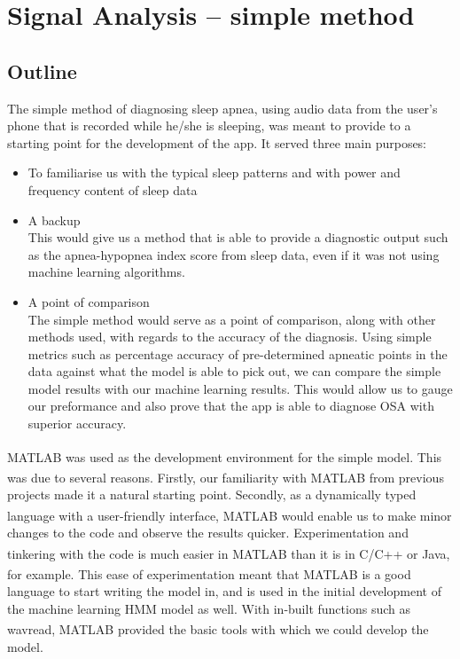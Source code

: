 \section{Signal Analysis -- simple method}

\subsection{Outline}

The simple method of diagnosing sleep apnea, using audio data from the user's phone that is recorded while he/she is sleeping, was meant to provide to a starting point for the development of the app. It served three main purposes:

\begin{itemize}
\item To familiarise us with the typical sleep patterns and with power and frequency content of sleep data
\item A backup\\
This would give us a method that is able to provide a diagnostic output such as the apnea-hypopnea index score from sleep data, even if it was not using machine learning algorithms. 
\item A point of comparison\\
The simple method would serve as a point of comparison, along with other methods used, with regards to the accuracy of the diagnosis. Using simple metrics such as percentage accuracy of pre-determined apneatic points in the data against what the model is able to pick out, we can compare the simple model results with our machine learning results. This would allow us to gauge our preformance and also prove that the app is able to diagnose OSA with superior accuracy.
\end{itemize}

MATLAB\textsuperscript{\textregistered{}} was used as the development environment for the simple model. This was due to several reasons. Firstly, our familiarity with MATLAB\textsuperscript{\textregistered{}} from previous projects made it a natural starting point. Secondly, as a dynamically typed language with a user-friendly interface, MATLAB\textsuperscript{\textregistered{}} would enable us to make minor changes to the code and observe the results quicker. Experimentation and tinkering with the code is much easier in MATLAB\textsuperscript{\textregistered{}}  than it is in C/C++ or Java, for example. This ease of experimentation meant that MATLAB\textsuperscript{\textregistered{}} is a good language to start writing the model in, and is used in the initial development of the machine learning HMM model as well. With in-built functions such as wavread, MATLAB\textsuperscript{\textregistered{}}  provided the basic tools with which we could develop the model.


